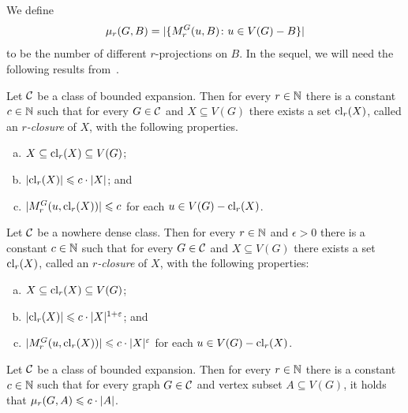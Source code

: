 We define 
\[\mu_r(G,B)=|\{M_r^G(u,B)\colon u\in V(G)- B\}|\]
to be the number of different $r$-projections on $B$.
In the sequel, we will need the following results from~\cite{drange2016kernelization,eickmeyer2016neighborhood}.

\begin{lemma}\label{lem:closure-be}
Let $\mathcal{C}$ be a class of bounded expansion. 
Then for every $r\in \mathbb{N}$ there is a constant $c\in \mathbb{N}$ such that for
every $G\in \mathcal{C}$ and $X\subseteq V(G)$ there exists a set $\mathrm{cl}_r(X)$, called an {\em{$r$-closure}} of $X$, with the following properties. 
\begin{enumerate}[(a)]
  \item $X\subseteq \mathrm{cl}_r(X)\subseteq V(G)$;
  \item $|\mathrm{cl}_r(X)|\leqslant c\cdot |X|$; and
  \item $|M_r^G(u,\mathrm{cl}_r(X))|\leqslant c$ for each $u\in V(G)- \mathrm{cl}_r(X)$.
\end{enumerate}
\end{lemma}

\begin{lemma}\label{lem:closure-nd}
Let $\mathcal{C}$ be a nowhere dense class. 
Then for every $r\in\mathbb{N}$ and $\epsilon>0$ there is a 
constant $c\in\mathbb{N}$ such that for every $G\in \mathcal{C}$ and $X\subseteq V(G)$ there exists a set 
$\mathrm{cl}_r(X)$,  called an {\em{$r$-closure}} of $X$, 
with the following properties: 
\begin{enumerate}[(a)]
  \item $X\subseteq \mathrm{cl}_r(X)\subseteq V(G)$;
  \item $|\mathrm{cl}_r(X)|\leqslant c\cdot |X|^{1+\varepsilon}$; and
  \item $|M_r^G(u,\mathrm{cl}_r(X))|\leqslant c\cdot |X|^{\varepsilon}$ for each $u\in V(G)- \mathrm{cl}_r(X)$.
\end{enumerate}
\end{lemma}

\begin{lemma}\label{lem:projection-complexity-be}
Let $\mathcal{C}$ be a class of bounded expansion. Then for every $r\in \mathbb{N}$ there is 
  a constant $c\in\mathbb{N}$ such that for every graph $G\in \mathcal{C}$ and vertex subset $A\subseteq V(G)$, 
  it holds that $\mu_r(G,A)\leqslant c\cdot |A|$.
\end{lemma}

